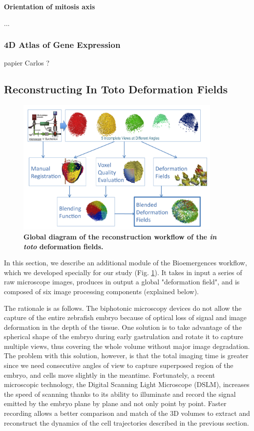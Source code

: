 \textbf{Orientation of mitosis axis}

  ... 

\subsubsection{4D Atlas of Gene Expression  }

  papier Carlos ? 

\subsection{Reconstructing In Toto Deformation Fields }
\begin{figure}
\begin{center}
\includegraphics[width=0.9\textwidth]{../../images/Reconstruction/washington/workflow_corrected.png}
\end{center}
\caption{\textbf{Global diagram of the reconstruction workflow of the \textit{in toto} deformation fields. }}
\label{washington_workflow}
\end{figure}

  In this section, we describe an additional module of the Bioemergences workflow, which we developed specially for our study (Fig. \ref{washington_workflow}). It takes in input a series of raw microscope images, produces in output a global "deformation field", and is composed of six image processing components (explained below).  

  The rationale is as follows. The biphotonic microscopy devices do not allow the capture of the entire zebrafish embryo because of optical loss of signal and image deformation in the depth of the tissue. One solution is to take advantage of the spherical shape of the embryo during early gastrulation and rotate it to capture multiple views, thus covering the whole volume without major image degradation. The problem with this solution, however, is that the total imaging time is greater since we need consecutive angles of view to capture superposed region of the embryo, and cells move slightly in the meantime. Fortunately, a recent microscopic technology, the Digital Scanning Light Microscope (DSLM), increases the speed of scanning thanks to its ability to illuminate and record the signal emitted by the embryo plane by plane and not only point by point. Faster recording allows a better comparison and match of the 3D volumes to extract and reconstruct the dynamics of the cell trajectories described in the previous section. 

